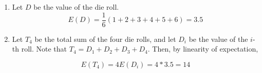 \begin{enumerate}[label=(\alph*)]
\item Let $D$ be the value of the die roll.
$$E(D) = \frac{1}{6}(1 + 2 + 3 + 4 + 5 + 6) = 3.5$$

\item Let $T_{4}$ be the total sum of the four die rolls, and let $D_{i}$ be
the value of the $i$-th roll. Note that $T_{4} = D_
{1} + D_{2} + D_{3} + D_{4}$. Then, by linearity of expectation,

$$E(T_{4}) = 4E(D_{i}) = 4*3.5 = 14$$
\end{enumerate}
